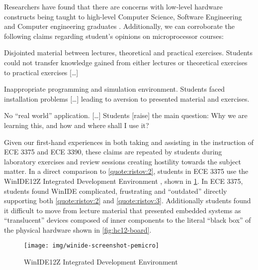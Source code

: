Researchers have found that there are concerns with low-level hardware constructs being taught to high-level Computer Science, Software Engineering and Computer engineering graduates \cite{Ristov2011, Stolikj2011}. Additionally, we can corroborate the following claims regarding student's opinions on microprocessor courses: 
\begin{displayquote}
    \begin{observations}
        \item Disjointed material between lectures, theoretical and practical
        exercises. Students could not transfer knowledge gained from either lectures or theoretical exercises to practical exercises [\dots] 
            \label{quote:ristov:1}
        \item Inappropriate programming and simulation environment. Students faced installation problems [\dots] leading to aversion to presented material and exercises.
            \label{quote:ristov:2}
        \item No ``real world'' application. [\dots] Students [raise] the main question: Why we are learning this, and how and where shall I use it?
            \label{quote:ristov:3}
    \end{observations}
\end{displayquote}
Given our first-hand experiences in both taking and assisting in the instruction of ECE 3375 and ECE 3390, these claims are repeated by students during laboratory exercises and review sessions creating hostility towards the subject matter. In a direct comparison to \cref{quote:ristov:2}, students in ECE 3375 use the WinIDE12Z Integrated Development Environment \cite{winide}, shown in \cref{fig:winide-screenshot-pemicro}. In ECE 3375, students found WinIDE complicated, frustrating and ``outdated'' \cite{evals:ece3375-2013, evals:ece3375-2014} directly supporting both \cref{quote:ristov:2} and \cref{quote:ristov:3}. Additionally students found it difficult to move from lecture material that presented embedded systems as ``translucent'' devices composed of inner components to the literal ``black box'' of the physical hardware shown in \cref{fig:hc12-board}. 

\begin{figure}[bh!]
    \centering
    \texttt{[image: img/winide-screenshot-pemicro]}
    \caption{WinIDE12Z Integrated Development Environment \cite{winide-screenshot}}
    \label{fig:winide-screenshot-pemicro}
\end{figure}

